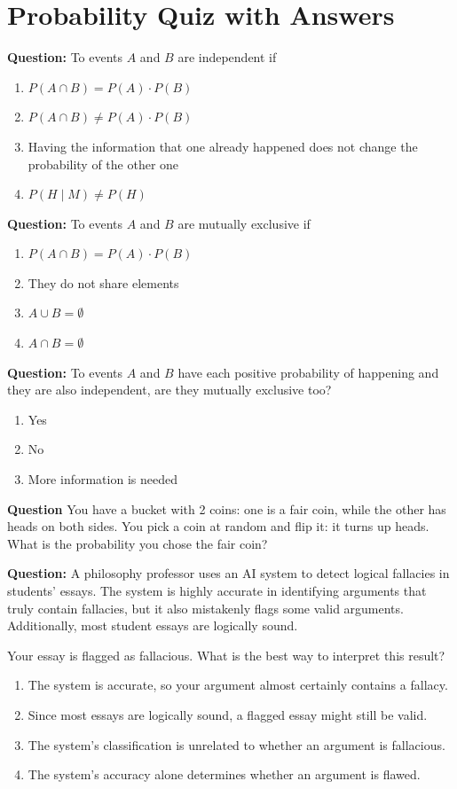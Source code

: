 \documentclass[12pt]{article}
\begin{document}
\section*{Probability Quiz with Answers}

\textbf{Question:}  
To events $A$ and $B$ are independent if
\begin{enumerate}
    \item[(A)] \( P(A \cap B) = P(A) \cdot P(B) \)
    \item[(B)] \( P(A \cap B) \neq P(A) \cdot P(B) \)
    \item[(C)] Having the information that one already happened does not change the probability of the other one
    \item[(D)] \( P(H \mid M) \neq P(H) \)
\end{enumerate}

\textbf{Question:}  
To events $A$ and $B$ are mutually exclusive if
\begin{enumerate}
    \item[(A)] \( P(A \cap B) = P(A) \cdot P(B) \)
    \item[(B)] They do not share elements
    \item[(C)] $A \cup B = \emptyset$
    \item[(D)] $A \cap B = \emptyset$
\end{enumerate}

\textbf{Question:}  
To events $A$ and $B$ have each positive probability of happening and they are also independent, are they mutually exclusive too?
\begin{enumerate}
    \item[(A)] Yes
    \item[(B)] No
    \item[(C)] More information is needed
\end{enumerate}

\textbf{Question}
You have a bucket with 2 coins: one is a fair coin, while the other has heads on both sides. You pick a coin at random and flip it: it turns up heads. What is the probability you chose the fair coin?

\textbf{Question:}  
A philosophy professor uses an AI system to detect logical fallacies in students’ essays. The system is highly accurate in identifying arguments that truly contain fallacies, but it also mistakenly flags some valid arguments. Additionally, most student essays are logically sound.  

Your essay is flagged as fallacious. What is the best way to interpret this result?  
\begin{enumerate}
    \item[(A)] The system is accurate, so your argument almost certainly contains a fallacy.  
    \item[(B)] Since most essays are logically sound, a flagged essay might still be valid.  
    \item[(C)] The system’s classification is unrelated to whether an argument is fallacious.  
    \item[(D)] The system’s accuracy alone determines whether an argument is flawed.  
\end{enumerate}
\end{document}
